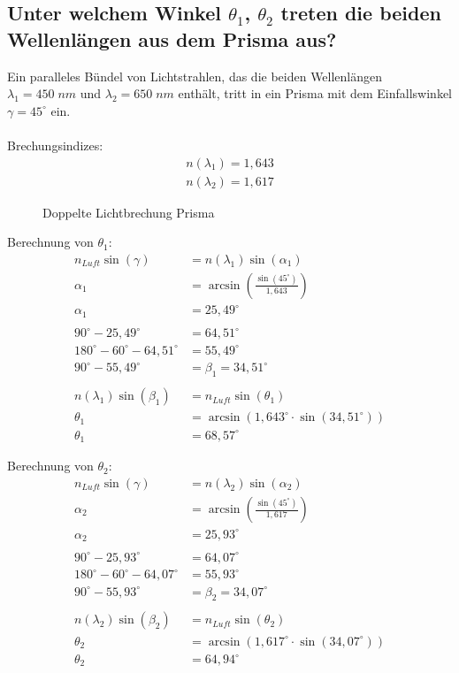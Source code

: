 \documentclass[a4paper]{scrartcl}
\numberwithin{equation}{subsection}
\begin{document}
\subsection{Unter welchem Winkel $\theta_1$, $\theta_2$ treten die beiden Wellenlängen aus dem Prisma aus?}
Ein paralleles Bündel von Lichtstrahlen, das die beiden Wellenlängen $\lambda_1 = 450\; nm$ und $\lambda_2 = 650\; nm$ enthält, tritt in ein Prisma mit dem Einfallswinkel $\gamma = 45^\circ$ ein.\\
\quad\\
Brechungsindizes:
\begin{align*}
n(\lambda_1) = 1,643 \\
n(\lambda_2) = 1,617
\end{align*}

\begin{figure}[H]
	\centering
	\caption{Doppelte Lichtbrechung Prisma}
	\centering
	\label{fig:AufgabePrisma}
\end{figure}

Berechnung von $\theta_1$:
\begin{align*}
	n_{Luft}\sin(\gamma) &= n(\lambda_1)\sin(\alpha_1) \\
	\alpha_1 &= \arcsin\left(\frac{\sin(45^\circ)}{1,643}\right) \\
	\alpha_1 &= 25,49^\circ \\
	\quad \\
	90^\circ - 25,49^\circ &= 64,51^\circ \\
	180^\circ - 60^\circ - 64,51^\circ &= 55,49^\circ \\
	90^\circ - 55,49^\circ &= \beta_1 = 34,51^\circ \\
	\quad \\
	n(\lambda_1)\sin(\beta_1) &= n_{Luft}\sin(\theta_1) \\
	\theta_1 &= \arcsin(1,643^\circ \cdot \sin(34,51^\circ)) \\
	\theta_1 &= 68,57^\circ
\end{align*}

Berechnung von $\theta_2$:
\begin{align*}
	n_{Luft}\sin(\gamma) &= n(\lambda_2)\sin(\alpha_2) \\
	\alpha_2 &= \arcsin\left(\frac{\sin(45^\circ)}{1,617}\right) \\
	\alpha_2 &= 25,93^\circ \\
	\quad \\
	90^\circ - 25,93^\circ &= 64,07^\circ \\
	180^\circ - 60^\circ - 64,07^\circ &= 55,93^\circ \\
	90^\circ - 55,93^\circ &= \beta_2 = 34,07^\circ \\
	\quad \\
	n(\lambda_2)\sin(\beta_2) &= n_{Luft}\sin(\theta_2) \\
	\theta_2 &= \arcsin(1,617^\circ \cdot \sin(34,07^\circ)) \\
	\theta_2 &= 64,94^\circ
\end{align*}
\end{document}
